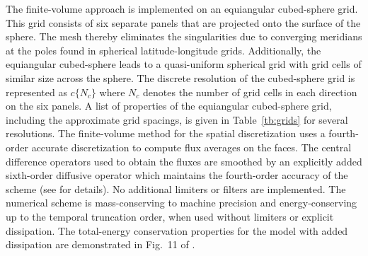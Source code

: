 The finite-volume approach is implemented on an
equiangular cubed-sphere grid.  This grid consists of six separate
panels that are projected onto the surface of the sphere.  The mesh thereby
eliminates the singularities due to converging meridians at the
poles found in spherical latitude-longitude grids.  Additionally, the
equiangular cubed-sphere leads to a quasi-uniform spherical grid with
grid cells of similar size across the sphere.  The discrete resolution
of the cubed-sphere grid is represented as $c\{N_c\}$ where $N_c$
denotes the number of grid cells in each direction on the six panels.  A
list of properties of the equiangular cubed-sphere grid, including the
approximate grid spacings, is given in
Table~\ref{tb:grids} for several resolutions.  The finite-volume method for
the spatial discretization uses a fourth-order accurate discretization
to compute flux averages on the faces.  The central difference operators
used to obtain the fluxes are smoothed by an explicitly added sixth-order diffusive
operator which maintains the fourth-order accuracy of the scheme
 (see \cite{mccorquodale2015adaptive} for details).
No additional limiters or filters are
implemented.  The numerical scheme is 
mass-conserving to machine precision and energy-conserving up to the
temporal truncation order, when used without limiters or explicit
dissipation.  The total-energy conservation properties for the model
with added dissipation are demonstrated in Fig.~11 of
\cite{mccorquodale2015adaptive}.

